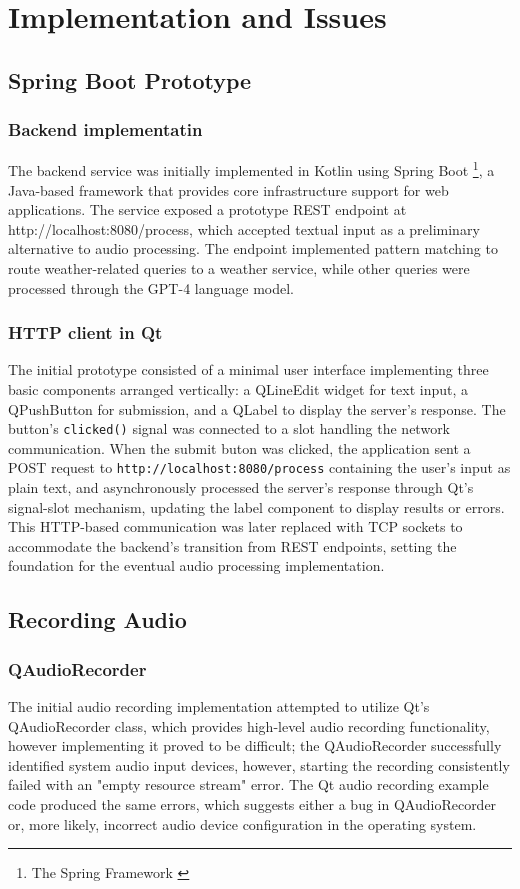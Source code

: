 \renewcommand*\chapterpagestyle{scrheadings}
\chapter{Implementation and Issues}

\section{Spring Boot Prototype}
\subsection{Backend implementatin}
The backend service was initially implemented in Kotlin using Spring Boot \footnote{The Spring Framework \cite{spring}},
a Java-based framework that provides core infrastructure support for web applications.
The service exposed a prototype REST endpoint at http://localhost:8080/process,
which accepted textual input as a preliminary alternative to audio processing.
The endpoint implemented pattern matching to route weather-related queries to a weather service,
while other queries were processed through the GPT-4 language model.

\subsection{HTTP client in Qt}
The initial prototype consisted of a minimal user interface
implementing three basic components arranged vertically:
a QLineEdit widget for text input,
a QPushButton for submission,
and a QLabel to display the server's response.
The button's \texttt{clicked()} signal was connected to a slot
handling the network communication.
When the submit buton was clicked, the application sent a POST request
to \texttt{http://localhost:8080/process} containing the user's input as plain text,
and asynchronously processed the server's response through Qt's signal-slot mechanism,
updating the label component to display results or errors.
This HTTP-based communication was later replaced with TCP sockets
to accommodate the backend's transition from REST endpoints,
setting the foundation for the eventual audio processing implementation.

\newpage
\section{Recording Audio}
\subsection{QAudioRecorder}
The initial audio recording implementation attempted to utilize Qt's QAudioRecorder class,
which provides high-level audio recording functionality, however implementing it proved to be difficult;
the QAudioRecorder successfully identified system audio input devices,
however, starting the recording consistently failed with an "empty resource stream" error.
The Qt audio recording example code produced the same errors,
which suggests either a bug in QAudioRecorder or, more likely,
incorrect audio device configuration in the operating system.

